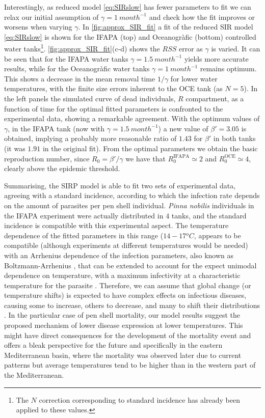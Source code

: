 Interestingly, as reduced model \cref{eq:SIRslow} has fewer parameters to
fit we can relax our initial assumption of $\gamma=\SI{1}{month^{-1}}$ and
check how the fit improves or worsens when varying $\gamma$.
In \cref{fig:approx_SIR_fit} a fit of the reduced SIR model
\cref{eq:SIRslow} is shown for the IFAPA (top) and Oceanogràfic (bottom)
controlled water tanks\footnote{The $N$ correction corresponding to standard
    incidence has already been applied to these values.}.
\cref{fig:approx_SIR_fit}(c-d) shows the $RSS$ error as $\gamma$ is varied.
It can be seen that for the IFAPA water tanks $\gamma=\SI{1.5}{month^{-1}}$
yields more accurate results, while for the Oceanogràfic water tanks
$\gamma=\SI{1}{month^{-1}}$ remains optimum. This shows a decrease in the mean
removal time $1/\gamma$ for lower water temperatures, with the finite size
errors inherent to the OCE tank (as $N=5$).
In the left panels the simulated curve of dead individuals, $R$
compartment, as a function of time for the optimal fitted parameters is
confronted to the experimental data, showing a remarkable agreement. With the
optimum values of $\gamma$, in the IFAPA tank (now with
$\gamma=\SI{1.5}{month^{-1}}$) a new value of $\beta'=3.05$ is obtained,
implying a probably more reasonable ratio of $1.43$ for $\beta'$ in both tanks
(it was $1.91$ in the original fit).
From the optimal parameters we obtain the basic reproduction number, since
$R_0=\beta'/\gamma$ we have that $R_0^{\textrm{IFAPA}}\simeq2$ and
$R_0^{\textrm{OCE}}\simeq4$, clearly above the epidemic threshold.

Summarising, the SIRP model is able to fit two sets of experimental data,
agreeing with a standard incidence, according to which the infection rate
depends on the amount of parasites per pen shell individual. \textit{Pinna
    nobilis} individuals in
the IFAPA experiment were actually distributed in $4$ tanks, and the
standard incidence is compatible with this experimental aspect. The temperature
dependence of the fitted parameters in this range ($14-17 {}^o C$, appears to
be compatible (although experiments at different temperatures would be needed)
with an Arrhenius dependence of the infection parameters, also known as
Boltzmann-Arrhenius
\cite{Brown2004,Molnar2017}, that can be extended to account for the
expect unimodal dependence on temperature, with a maximum infectivity at a
characteristic temperature for the parasite \cite{Molnar2017}. Therefore, we
can assume that global change (or temperature shifts) is expected to have
complex effects on infectious diseases, causing some to increase, others to
decrease, and many to shift their distributions \cite{Rohr2020}.
In the particular case of pen shell mortality, our model results suggest the
proposed mechanism of lower disease expression at lower temperatures. This
might have direct consequences for the development of the mortality event and
offers a bleak perspective for the future and specifically in the eastern
Mediterranean basin, where the mortality was observed later due to current
patterns but average temperatures tend to be higher than in the western part of
the Mediterranean.

